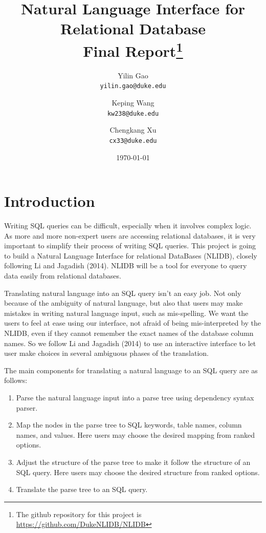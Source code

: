 \documentclass[twocolumn]{article}
\begin{document}
\title{Natural Language Interface for Relational Database\\	
	\small{Final Report}\footnote{The github repository for this project is \url{https://github.com/DukeNLIDB/NLIDB}}}

\author{Yilin Gao \\
	\small \texttt{yilin.gao@duke.edu} \and 
	Keping Wang \\
	\small \texttt{kw238@duke.edu} \and 
	Chengkang Xu \\
	\small \texttt{cx33@duke.edu} }
	
\date{\today}
\maketitle

\section{Introduction}\label{sec:introduction}

Writing SQL queries can be difficult, especially when it involves complex logic. As more and more non-expert users are accessing relational databases, it is very important to simplify their process of writing SQL queries. This project is going to build a Natural Language Interface for relational DataBases (NLIDB), closely following Li and Jagadish (2014)\cite{li2014}. NLIDB will be a tool for everyone to query data easily from relational databases.

Translating natural language into an SQL query isn't an easy job. Not only because of the ambiguity of natural language, but also that users may make mistakes in writing natural language input, such as mis-spelling. We want the users to feel at ease using our interface, not afraid of being mis-interpreted by the NLIDB, even if they cannot remember the exact names of the database column names. So we follow Li and Jagadish (2014)\cite{li2014} to use an interactive interface to let user make choices in several ambiguous phases of the translation.

The main components for translating a natural language to an SQL query are as follows:

\begin{enumerate}
  \item Parse the natural language input into a parse tree using dependency syntax parser.
  \item Map the nodes in the parse tree to SQL keywords, table names, column names, and values. Here users may choose the desired mapping from ranked options.
  \item Adjust the structure of the parse tree to make it follow the structure of an SQL query. Here users may choose the desired structure from ranked options.
  \item Translate the parse tree to an SQL query.
\end{enumerate}
\end{document}
